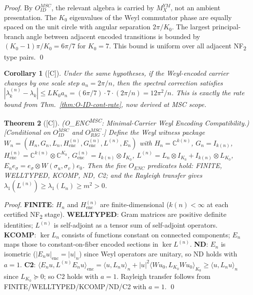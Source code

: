 \documentclass[12pt,oneside]{amsbook}
\theoremstyle{plain}
\newtheorem{theorem}{Theorem}[section]
\newtheorem{corollary}[theorem]{Corollary}
\theoremstyle{definition}
\theoremstyle{remark}
\newcommand{\status}[1]{\textup{[#1]}}
\begin{document}
\begin{proof}
By $O_{ID}^{MSC}$, the relevant algebra is carried by $M_X^{YM}$, not
an ambient presentation. The $K_0$ eigenvalues of the Weyl commutator
phase are equally spaced on the unit circle with angular separation
$2\pi/K_0$. The largest principal-branch angle between adjacent
encoded transitions is bounded by $(K_0-1)\pi/K_0 = 6\pi/7$ for
$K_0 = 7$. This bound is uniform over all adjacent NF\textsubscript{2}
type pairs.
\qed
\end{proof}

\begin{corollary}[\status{C}]\label{cor:YM-RIG-1}
Under the same hypotheses, if the Weyl-encoded carrier changes by one
scale step $a_n = 2\pi/n$, then the spectral correction satisfies
$|\lambda_k^{(n)} - \lambda_k| \le L K_0 a_n = (6\pi/7) \cdot 7 \cdot
(2\pi/n) = 12\pi^2/n$.
This is exactly the rate bound from
Thm.~\ref{thm:O-ID-cont-rate}, now derived at MSC scope.
\end{corollary}

\begin{theorem}[\status{C}]\label{thm:YM-ENC-MSC}
\textup{(O\_{ENC}\textsuperscript{MSC}: Minimal-Carrier Weyl Encoding Compatibility.)}
\textup{[Conditional on $O_{ID}^{MSC}$ and $O_{RIG}^{MSC}$.]}
Define the Weyl witness package
$W_n = (H_n, G_n, L_n, H_{\mathrm{enc}}^{(n)}, G_{\mathrm{enc}}^{(n)},
L^{(n)}, E_n)$
with $H_n = \mathbb{C}^{k(n)}$, $G_n = I_{k(n)}$,
$H_{\mathrm{enc}}^{(n)} = \mathbb{C}^{k(n)} \otimes \mathbb{C}^{K_0}$,
$G_{\mathrm{enc}}^{(n)} = I_{k(n)} \otimes I_{K_0}$,
$L^{(n)} = L_n \otimes I_{K_0} + I_{k(n)} \otimes L_{K_0}$,
$E_n e_\sigma = e_\sigma \otimes W(\sigma_u,\sigma_v) e_0$.
Then the five $O_{ENC}$ predicates hold:
\textup{FINITE}, \textup{WELLTYPED}, \textup{KCOMP}, \textup{ND}, \textup{C2};
and the Rayleigh transfer gives
$\lambda_1(L^{(n)}) \ge \lambda_1(L_n) \ge m^2 > 0$.
\end{theorem}

\begin{proof}
\textbf{FINITE}: $H_n$ and $H_{\mathrm{enc}}^{(n)}$ are finite-dimensional
($k(n) < \infty$ at each certified NF\textsubscript{2} stage).
\textbf{WELLTYPED}: Gram matrices are positive definite identities;
$L^{(n)}$ is self-adjoint as a tensor sum of self-adjoint operators.
\textbf{KCOMP}: $\ker L_n$ consists of functions constant on connected
components; $E_n$ maps those to constant-on-fiber encoded sections in
$\ker L^{(n)}$.
\textbf{ND}: $E_n$ is isometric ($|E_n u|_{\mathrm{enc}} = |u|_n$)
since Weyl operators are unitary, so ND holds with $a=1$.
\textbf{C2}: $\langle E_n u, L^{(n)} E_n u\rangle_{\mathrm{enc}}
= \langle u, L_n u\rangle_n + |u|^2 \langle W u_0, L_{K_0} W u_0\rangle_{K_0}
\ge \langle u, L_n u\rangle_n$ since $L_{K_0} \succeq 0$;
so C2 holds with $a=1$.
Rayleigh transfer follows from FINITE/WELLTYPED/KCOMP/ND/C2 with $a=1$.
\qed
\end{proof}
\end{document}
